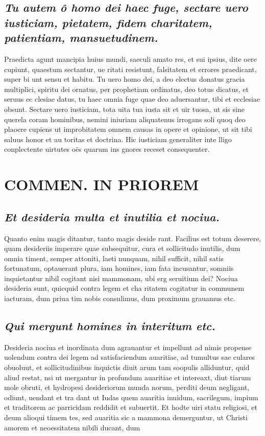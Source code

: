 \documentclass{article}
\begin{document}
\begin{pages}
\subsection*{\textit{Tu autem ô homo dei haec fuge, sectare uero iusticiam, pietatem, fidem charitatem, patientiam, mansuetudinem. }}\pstart Praedicta agunt mancipia huius mundi, saeculi amato res, et sui ipsius, dite oere cupiunt, quaestum sectantur, ue ritati resistunt, falsitatem et errores praedicant, super bi unt sensu et habitu. Tu uero homo dei, a deo electus donatus gracia multiplici, spiritu dei ornatus, per prophetiam ordinatus, deo totus dicatus, et seruus ec clesiae datus, tu haec omnia fuge quae deo aduersantur, tibi et ecclesiae obsunt. Sectare uero iusticiam, tota uita tua iusta sit et uir tuosa, ut sis sine querela coram hominibus, nemini iniuriam aliquatenus irrogans soli quoq deo plaoere cupiens ut improbitatem omnem causas in opere et opinione, ut sit tibi saluus honor et au toritas et doctrina. Hic iusticiam generaliter inte lligo conplectente uirtutes oës quarum ins gnores receset consequenter.  \pend
\section*{COMMEN. IN PRIOREM }
\marginpar{[ p.168 ]}
{}
\subsection*{\textit{Et desideria multa et inutilia et nociua. }}\pstart Quanto enim magis ditantur, tanto magis deside rant. Facilius est totum deserere, quam desideriis imperare quae subsequitur, cura et sollicitudo inutilis, dum omnia timent, semper attoniti, laeti nunquam, nihil sufficit, nihil satis fortunatum, optauerant plura, iam homines, iam fata incusantur, somniis inquietantur nibil cogitant nisi mammonam, ubi erg seruitium dei? Nociua desideria sunt, quicquid contra legem et cha ritatem cogitatur in communem iacturam, dum priua tim nobis consulimus, dum proximum grauamus etc.  \pend
{}
{}
\subsection*{\textit{Qui mergunt homines in interitum etc. }}\pstart Desideria nociua et inordinata dum agrauantur et impellunt ad nimis propense uolendum contra dei legem ad satisfaciendum auaritiae, ad tumultus sae culares obuoluut, et sollicitudinibus inquictis diuit arum tam soopulis alliduntur, quid aliud restat, nsi ut mergantur in profundum auaritiae et intereaxt, diut tiarum mole obruti, et hydropesi desideriorum munda norum, perditi deum negligant, odiunt, uendant et tra dant ut Iudas quem auaritia inuidum, sacrilegum, impium et traditorem ac parricidam reddidit et subuertit. Et hodte uiri statu religiosi, et deum alioqui timem tes, sed auaritia sic a mammona demerguntur, ut Christi amorem et neoessitatem nibili ducant, dum  \pend

\end{pages}
\end{document}
